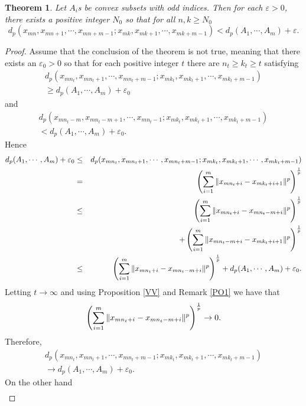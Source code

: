 \documentclass{amsart}
\newtheorem{theorem}{Theorem}[section]
\theoremstyle{definition}
\theoremstyle{remark}
\begin{document}
\begin{theorem} Let $A_i$s be convex subsets with odd indices. Then for each $\varepsilon>0$, there exists a positive integer $N_0$ so that for all $n,k\geq N_0$
$$d_p(x_{mn},x_{mn+1},\cdots,x_{mn+m-1};x_{mk},x_{mk+1},\cdots,x_{mk+m-1})<d_p(A_1,\cdots,A_m)+\varepsilon.$$
\end{theorem}
\begin{proof}Assume that the conclusion of the theorem is not true, meaning that there exists an $\varepsilon_0>0$ so that for each positive integer $t$ there are $n_t\geq k_t\geq t$ satisfying
\begin{eqnarray*}d_p(x_{mn_t},x_{mn_t+1},\cdots,x_{mn_t+m-1};x_{mk_t},x_{mk_t+1},\cdots,x_{mk_t+m-1})\\\geq d_p(A_1,\cdots,A_m)+\varepsilon_0\qquad\qquad\qquad\qquad\qquad\end{eqnarray*} and
\begin{eqnarray*}d_p(x_{mn_t-m},x_{mn_t-m+1},\cdots,x_{mn_t-1};x_{mk_t},x_{mk_t+1},\cdots,x_{mk_t+m-1})\\<d_p(A_1,\cdots,A_m)+\varepsilon_0.\qquad\qquad\qquad\qquad\qquad\end{eqnarray*}
Hence
\begin{eqnarray*}d_p(A_1,\cdots,A_m)+\varepsilon_0&\leq& d_p(x_{mn_t},x_{mn_t+1},\cdots,x_{mn_t+m-1};x_{mk_t},x_{mk_t+1},\cdots,x_{mk_t+m-1})\\&=&\left(\sum_{i=1}^m\|x_{mn_t+i}-x_{mk_t+i+1}\|^p\right)^{1\over p}\\&\leq&\left(\sum_{i=1}^m\|x_{mn_t+i}-x_{mn_t-m+i}\|^p\right)^{1\over p}\\&&+\left(\sum_{i=1}^m\|x_{mn_t-m+i}-x_{mk_t+i+1}\|^p\right)^{1\over p}\\&\leq&\left(\sum_{i=1}^m\|x_{mn_t+i}-x_{mn_t-m+i}\|^p\right)^{1\over p}+d_p(A_1,\cdots,A_m)+\varepsilon_0.
\end{eqnarray*}
Letting $t\to\infty$ and using Proposition \ref{VV} and Remark \ref{PO1} we have that  $$\left(\sum_{i=1}^m\|x_{mn_t+i}-x_{mn_t-m+i}\|^p\right)^{1\over p}\to0.$$ Therefore,
\begin{eqnarray}\label{SD}
d_p(x_{mn_t},x_{mn_t+1},\cdots,x_{mn_t+m-1};x_{mk_t},x_{mk_t+1},\cdots,x_{mk_t+m-1})\nonumber\\\to d_p(A_1,\cdots,A_m)+\varepsilon_0.\qquad\qquad\qquad\qquad\qquad
\end{eqnarray}
On the other hand
\begin{eqnarray*}

\end{eqnarray*}
\end{proof}
\end{document}
